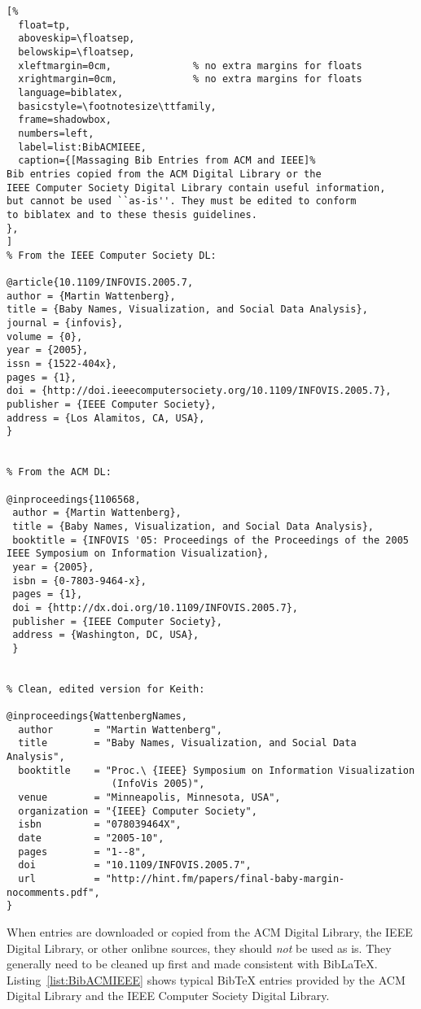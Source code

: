 \begin{samepage}
\begin{lstlisting}[%
  float=tp,
  aboveskip=\floatsep,
  belowskip=\floatsep,
  xleftmargin=0cm,              % no extra margins for floats
  xrightmargin=0cm,             % no extra margins for floats
  language=biblatex,
  basicstyle=\footnotesize\ttfamily,
  frame=shadowbox,
  numbers=left,
  label=list:BibACMIEEE,
  caption={[Massaging Bib Entries from ACM and IEEE]%
Bib entries copied from the ACM Digital Library or the
IEEE Computer Society Digital Library contain useful information,
but cannot be used ``as-is''. They must be edited to conform
to biblatex and to these thesis guidelines.
},
]
% From the IEEE Computer Society DL:

@article{10.1109/INFOVIS.2005.7,
author = {Martin Wattenberg},
title = {Baby Names, Visualization, and Social Data Analysis},
journal = {infovis},
volume = {0},
year = {2005},
issn = {1522-404x},
pages = {1},
doi = {http://doi.ieeecomputersociety.org/10.1109/INFOVIS.2005.7},
publisher = {IEEE Computer Society},
address = {Los Alamitos, CA, USA},
}


% From the ACM DL:

@inproceedings{1106568,
 author = {Martin Wattenberg},
 title = {Baby Names, Visualization, and Social Data Analysis},
 booktitle = {INFOVIS '05: Proceedings of the Proceedings of the 2005 IEEE Symposium on Information Visualization},
 year = {2005},
 isbn = {0-7803-9464-x},
 pages = {1},
 doi = {http://dx.doi.org/10.1109/INFOVIS.2005.7},
 publisher = {IEEE Computer Society},
 address = {Washington, DC, USA},
 }


% Clean, edited version for Keith:

@inproceedings{WattenbergNames,
  author       = "Martin Wattenberg",
  title        = "Baby Names, Visualization, and Social Data Analysis",
  booktitle    = "Proc.\ {IEEE} Symposium on Information Visualization
                  (InfoVis 2005)",
  venue        = "Minneapolis, Minnesota, USA",
  organization = "{IEEE} Computer Society",
  isbn         = "078039464X",
  date         = "2005-10",
  pages        = "1--8",
  doi          = "10.1109/INFOVIS.2005.7",
  url          = "http://hint.fm/papers/final-baby-margin-nocomments.pdf",
}

\end{lstlisting}
\end{samepage}


When  entries are downloaded or copied from the ACM
Digital Library, the IEEE Digital Library, or other onlibne sources,
they should \emph{not} be used as is. They generally need to be
cleaned up first and made consistent with BibLaTeX.
Listing~\ref{list:BibACMIEEE} shows typical BibTeX entries provided by
the ACM Digital Library and the IEEE Computer Society Digital Library.


